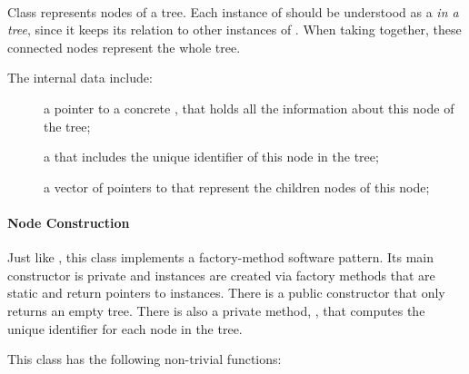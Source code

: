 \documentclass{article}
\begin{document}
\paragraph{\ctree}

Class \ctree represents nodes of a tree. Each instance of \ctree should be understood as a \cnode \emph{in a tree}, since it keeps its relation to other instances of \ctree. When taking together, these connected nodes represent the whole tree.

The internal data include:

\begin{description}
\item[] a pointer to a concrete \cnode, that holds all the information about this node of the tree;
\item[] a \cstring that includes the unique identifier of this node in the tree;
\item[] a vector of pointers to \ctree that represent the children nodes of this node;
\end{description}

\paragraph{Node Construction}

Just like \cnode, this class implements a factory-method software pattern. Its main constructor is private and instances are created via factory methods that are static and return pointers to \ctree instances. There is a public constructor that only returns an empty tree. There is also a private method, , that computes the unique identifier for each node in the tree.

This class has the following non-trivial functions:
\begin{description}
\item[] 
\item[] 
\item[] 
\item[] 
\item[] 
\item[] 
\item[] 
\item[] 
\end{description}
\end{document}

